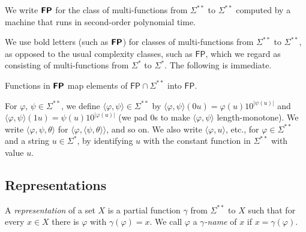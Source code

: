 \documentclass[envcountsect,envcountsame,orivec,oribibl]{llncs}
\newcommand{\classonefont}[1]{\mathsf{#1}}
\newcommand{\classFP}{\classonefont{FP}}
\newcommand{\classtwofont}[1]{\text{\bfseries \sffamily \upshape #1}}
\newcommand{\classFPtwo}{\classtwofont{FP}}
\newcommand{\LM}{\varSigma ^{**}}
\begin{document}
\begin{definition}
 We write $\classFPtwo$ for the class of
 multi-functions from $\LM$ to $\LM$ 
 computed by a machine that runs
 in second-order polynomial time.
\end{definition}

We use bold letters (such as $\classFPtwo$) 
for classes of multi-functions from $\LM$ to $\LM$, 
as opposed to the usual complexity classes, such as $\classFP$, 
which we regard as consisting of multi-functions from $\varSigma ^*$ to $\varSigma ^*$.
The following is immediate. 

\begin{lemma}
\label{lemma: classFPtwo maps classFP to classFP}
 Functions in $\classFPtwo$ map 
 elements of $\classFP \cap \LM$ into $\classFP$.
\end{lemma}

For $\varphi$, $\psi \in \LM$, 
we define $\langle \varphi, \psi \rangle \in \LM$ by 
$\langle \varphi, \psi \rangle(0u) = \varphi(u) 10^{|\psi(u)|}$ and 
$\langle \varphi, \psi \rangle(1u) = \psi(u) 10^{|\varphi(u)|}$
(we pad $0$s to make $\langle \varphi, \psi \rangle$ length-monotone).
We write $\langle \varphi, \psi, \theta \rangle$ 
for $\langle \varphi, \langle \psi, \theta \rangle \rangle$, and so on.
We also write $\langle \varphi, u \rangle$, etc., for 
$\varphi \in \LM$ and a string $u \in \varSigma ^*$, 
by identifying $u$ with the constant function in $\LM$ with value $u$. 

\subsection{Representations}
\label{subsection: representations}

A \emph{representation} of a set $X$ 
is a partial function $\gamma$ from $\LM$ to $X$
such that for every $x \in X$ there is $\varphi$ with $\gamma (\varphi) = x$.
We call $\varphi$ a {\em $\gamma$-name} of $x$
if $x = \gamma (\varphi)$.
\end{document}
